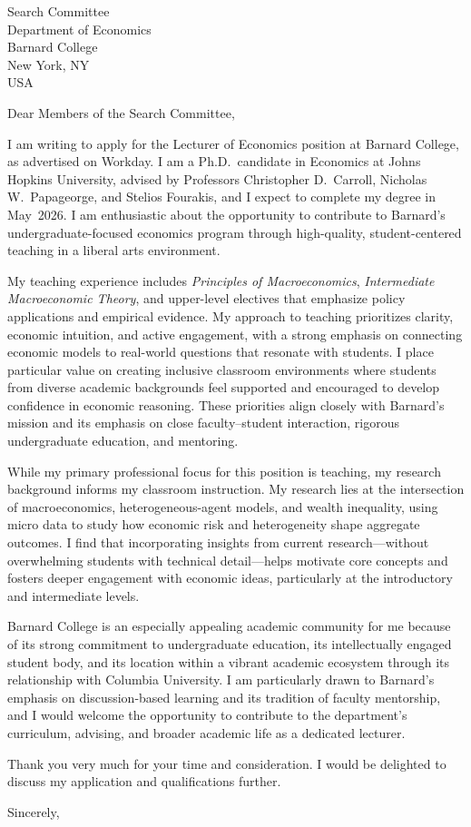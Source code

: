 \documentclass[11pt,letterpaper]{letter}
\begin{document}
\begin{letter}{Search Committee \\
Department of Economics \\
Barnard College \\
New York, NY \\ USA}

\opening{Dear Members of the Search Committee,}

I am writing to apply for the Lecturer of Economics position at Barnard College, as advertised on Workday. I am a Ph.D.\ candidate in Economics at Johns Hopkins University, advised by Professors Christopher D.~Carroll, Nicholas W.~Papageorge, and Stelios Fourakis, and I expect to complete my degree in May~2026. I am enthusiastic about the opportunity to contribute to Barnard’s undergraduate-focused economics program through high-quality, student-centered teaching in a liberal arts environment.

My teaching experience includes \textit{Principles of Macroeconomics}, \textit{Intermediate Macroeconomic Theory}, and upper-level electives that emphasize policy applications and empirical evidence. My approach to teaching prioritizes clarity, economic intuition, and active engagement, with a strong emphasis on connecting economic models to real-world questions that resonate with students. I place particular value on creating inclusive classroom environments where students from diverse academic backgrounds feel supported and encouraged to develop confidence in economic reasoning. These priorities align closely with Barnard’s mission and its emphasis on close faculty–student interaction, rigorous undergraduate education, and mentoring.

While my primary professional focus for this position is teaching, my research background informs my classroom instruction. My research lies at the intersection of macroeconomics, heterogeneous-agent models, and wealth inequality, using micro data to study how economic risk and heterogeneity shape aggregate outcomes. I find that incorporating insights from current research—without overwhelming students with technical detail—helps motivate core concepts and fosters deeper engagement with economic ideas, particularly at the introductory and intermediate levels.

Barnard College is an especially appealing academic community for me because of its strong commitment to undergraduate education, its intellectually engaged student body, and its location within a vibrant academic ecosystem through its relationship with Columbia University. I am particularly drawn to Barnard’s emphasis on discussion-based learning and its tradition of faculty mentorship, and I would welcome the opportunity to contribute to the department’s curriculum, advising, and broader academic life as a dedicated lecturer.

Thank you very much for your time and consideration. I would be delighted to discuss my application and qualifications further.

\closing{Sincerely,}

\end{letter}
\end{document}
